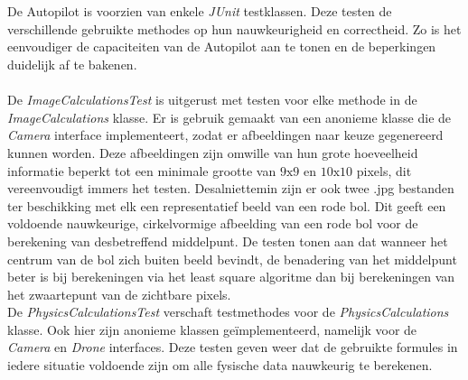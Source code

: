 \\
\\
De Autopilot is voorzien van enkele \textit{JUnit} testklassen. Deze testen de verschillende gebruikte methodes op hun nauwkeurigheid en correctheid. Zo is het eenvoudiger de capaciteiten van de Autopilot aan te tonen en de beperkingen duidelijk af te bakenen.
\\
\\
De \textit{ImageCalculationsTest} is uitgerust met testen voor elke methode in de \textit{ImageCalculations} klasse. Er is gebruik gemaakt van een anonieme klasse die de \textit{Camera} interface implementeert, zodat er afbeeldingen naar keuze gegenereerd kunnen worden. Deze afbeeldingen zijn omwille van hun grote hoeveelheid informatie beperkt tot een minimale grootte van \(9\text{x}9\) en \(10\text{x}10\) pixels, dit vereenvoudigt immers het testen. Desalniettemin zijn er ook twee .jpg bestanden ter beschikking met elk een representatief beeld van een rode bol. Dit geeft een voldoende nauwkeurige, cirkelvormige afbeelding van een rode bol voor de berekening van desbetreffend middelpunt. De testen tonen aan dat wanneer het centrum van de bol zich buiten beeld bevindt, de benadering van het middelpunt beter is bij berekeningen via het least square algoritme dan bij berekeningen van het zwaartepunt van de zichtbare pixels.%
\\
De \textit{PhysicsCalculationsTest} verschaft testmethodes voor de \textit{PhysicsCalculations} klasse. Ook hier zijn anonieme klassen ge\"implementeerd, namelijk voor de \textit{Camera} en \textit{Drone} interfaces. Deze testen geven weer dat de gebruikte formules in iedere situatie voldoende zijn om alle fysische data nauwkeurig te berekenen.


